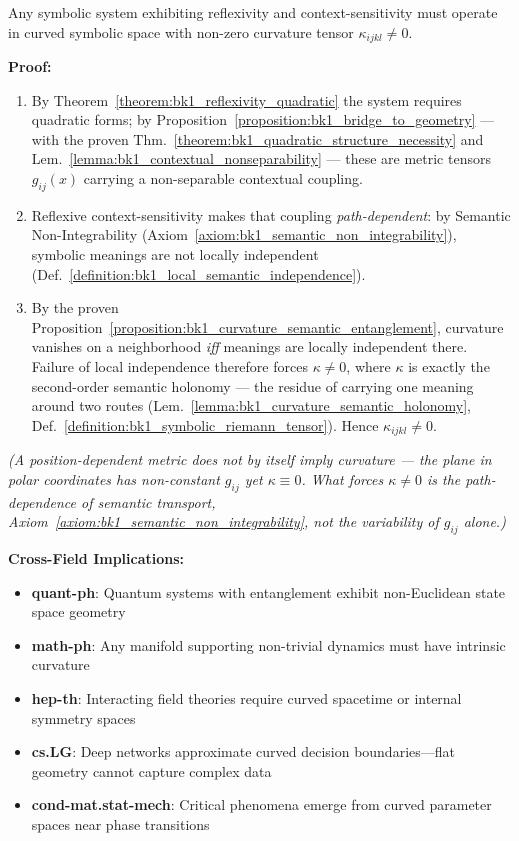 \begin{corollary}
\label{corollary:bk1_non_euclidean_necessity}
Any symbolic system exhibiting reflexivity and context-sensitivity must operate in curved symbolic space with non-zero curvature tensor $\kappa_{ijkl} \neq 0$.

\textbf{Proof:}
\begin{enumerate}
\item By Theorem~\ref{theorem:bk1_reflexivity_quadratic} the system requires quadratic forms; by Proposition~\ref{proposition:bk1_bridge_to_geometry} --- with the proven Thm.~\ref{theorem:bk1_quadratic_structure_necessity} and Lem.~\ref{lemma:bk1_contextual_nonseparability} --- these are metric tensors $g_{ij}(x)$ carrying a non-separable contextual coupling.
\item Reflexive context-sensitivity makes that coupling \emph{path-dependent}: by Semantic Non-Integrability (Axiom~\ref{axiom:bk1_semantic_non_integrability}), symbolic meanings are not locally independent (Def.~\ref{definition:bk1_local_semantic_independence}).
\item By the proven Proposition~\ref{proposition:bk1_curvature_semantic_entanglement}, curvature vanishes on a neighborhood \emph{iff} meanings are locally independent there. Failure of local independence therefore forces $\kappa \neq 0$, where $\kappa$ is exactly the second-order semantic holonomy --- the residue of carrying one meaning around two routes (Lem.~\ref{lemma:bk1_curvature_semantic_holonomy}, Def.~\ref{definition:bk1_symbolic_riemann_tensor}). Hence $\kappa_{ijkl} \neq 0$.
\end{enumerate}
\noindent\emph{(A position-dependent metric does not by itself imply curvature --- the plane in polar coordinates has non-constant $g_{ij}$ yet $\kappa \equiv 0$. What forces $\kappa \neq 0$ is the path-dependence of semantic transport, Axiom~\ref{axiom:bk1_semantic_non_integrability}, not the variability of $g_{ij}$ alone.)}

\textbf{Cross-Field Implications:}
\begin{itemize}
\item \textbf{quant-ph}: Quantum systems with entanglement exhibit non-Euclidean state space geometry
\item \textbf{math-ph}: Any manifold supporting non-trivial dynamics must have intrinsic curvature
\item \textbf{hep-th}: Interacting field theories require curved spacetime or internal symmetry spaces
\item \textbf{cs.LG}: Deep networks approximate curved decision boundaries—flat geometry cannot capture complex data
\item \textbf{cond-mat.stat-mech}: Critical phenomena emerge from curved parameter spaces near phase transitions
\end{itemize}
\end{corollary}


